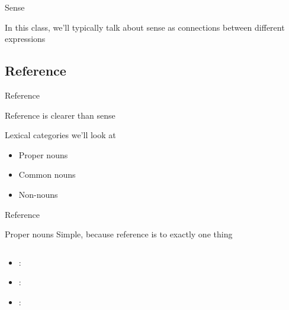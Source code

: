 \documentclass{beamer}
\newcommand{\subtwoone}{Sense}
\newcommand{\subtwotwo}{Reference}
\begin{document}
      \begin{frame}{\subtwoone}
        \begin{block}{}
          In this class, we'll typically talk about sense as connections between different expressions
        \end{block}
      \end{frame}

    \subsection{\subtwotwo}
      \begin{frame}{\subtwotwo}
        \begin{block}{}
          Reference is clearer than sense
        \end{block}
        \begin{block}{Lexical categories we'll look at}
          \begin{itemize}
            \item Proper nouns
            \item Common nouns
            \item Non-nouns
          \end{itemize}
        \end{block}
      \end{frame}

      \begin{frame}[t]{\subtwotwo}
        \begin{block}{Proper nouns}
          Simple, because reference is to exactly one thing
        \end{block}
        \begin{columns}
            \begin{minipage}[c][0.6\textheight]{\linewidth}
              \begin{block}{}
                \begin{itemize}
                  \item {}:
                  \item<2-> :
                  \item<3-> :
                \end{itemize}
              \end{block}
            \end{minipage}
        \end{columns}
      \end{frame}
\end{document}
